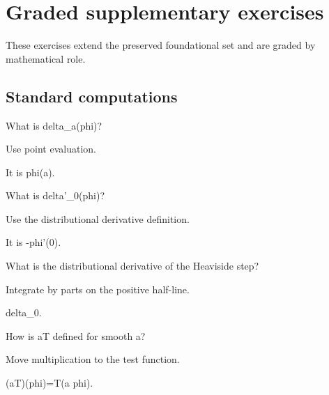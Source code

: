\section{Graded supplementary exercises}
These exercises extend the preserved foundational set and are graded by mathematical role.

\subsection*{Standard computations}

\begin{exercise}\label{exr:iii16-expand-01}
What is delta\_a(phi)?
\end{exercise}
\begin{hint}
Use point evaluation.
\end{hint}
\begin{solution}
It is phi(a).
\end{solution}

\begin{exercise}\label{exr:iii16-expand-02}
What is delta'\_0(phi)?
\end{exercise}
\begin{hint}
Use the distributional derivative definition.
\end{hint}
\begin{solution}
It is -phi'(0).
\end{solution}

\begin{exercise}\label{exr:iii16-expand-03}
What is the distributional derivative of the Heaviside step?
\end{exercise}
\begin{hint}
Integrate by parts on the positive half-line.
\end{hint}
\begin{solution}
delta\_0.
\end{solution}

\begin{exercise}\label{exr:iii16-expand-04}
How is aT defined for smooth a?
\end{exercise}
\begin{hint}
Move multiplication to the test function.
\end{hint}
\begin{solution}
(aT)(phi)=T(a phi).
\end{solution}

